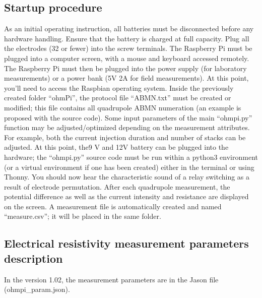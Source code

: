 \documentclass[letterpaper,10pt,english]{sphinxmanual}
\begin{document}
\subsection{Startup procedure}
\label{\detokenize{V1_02:startup-procedure}}
\sphinxAtStartPar
As an initial operating instruction, all batteries must be disconnected before any hardware handling. Ensure that the battery is charged at full capacity. Plug all the electrodes (32 or fewer)
into the screw terminals. The Raspberry Pi must be plugged into a computer screen, with a mouse and keyboard accessed remotely. The Raspberry Pi must then be plugged into the power supply
(for laboratory measurements) or a power bank (5V \sphinxhyphen{} 2A for field measurements). At this point, you’ll need to access the Raspbian operating system. Inside the previously created folder “ohmPi”,
the protocol file “ABMN.txt” must be created or modified; this file contains all quadrupole ABMN numeration (an example is proposed with the source code). Some input parameters of the main “ohmpi.py”
function may be adjusted/optimized depending on the measurement attributes. For example, both the current injection duration and number of stacks can be adjusted. At this point, the9 V and 12\sphinxhyphen{}V battery can be
plugged into the hardware; the “ohmpi.py” source code must be run within a python3 environment (or a virtual environment if one has been created) either in the terminal or using Thonny. You should now
hear the characteristic sound of a relay switching as a result of electrode permutation. After each quadrupole measurement, the potential difference as well as the current intensity and resistance
are displayed on the screen. A measurement file is automatically created and named “measure.csv”; it will be placed in the same folder.


\subsection{Electrical resistivity measurement parameters description}
\label{\detokenize{V1_02:electrical-resistivity-measurement-parameters-description}}
\sphinxAtStartPar
In the version 1.02, the measurement parameters are in the Jason file (ohmpi\_param.json).

\begin{sphinxVerbatim}[commandchars=\\\{\},numbers=left,firstnumber=1,stepnumber=1]
    
    
   
   
   
  
\end{sphinxVerbatim}
\end{document}
